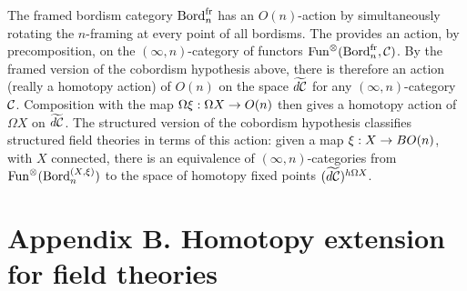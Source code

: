 \documentclass{amsart}
\begin{document}
The framed bordism category $\mathrm{Bord}^\mathrm{fr}_n$ has an $O(n)$-action by simultaneously rotating the $n$-framing at every point of all bordisms.  The provides an action, by precomposition, on the $(\infty,n)$-category of functors $\operatorname{Fun}^\otimes(\mathrm{Bord}^\mathrm{fr}_n,\mathcal C)$.  By the framed version of the cobordism hypothesis above, there is therefore an action (really a homotopy action) of $O(n)$ on the space $\widetilde{d\mathcal C}$ for any $(\infty,n)$-category $\mathcal C$.  Composition with the map $\Omega \xi: \Omega X \rightarrow O(n)$ then gives a homotopy action of $\Omega X$ on $\widetilde{d\mathcal C}$.  The structured version of the cobordism hypothesis classifies structured field theories in terms of this action: given a map $\xi: X \rightarrow BO(n)$, with $X$ connected, there is an equivalence of $(\infty,n)$-categories from $\operatorname{Fun}^\otimes(\mathrm{Bord}_n^{(X,\xi)})$ to the space of homotopy fixed points $(\widetilde{d\mathcal C})^{h\Omega X}$.


\renewcommand{\theapptheorem}{B.\arabic{apptheorem}}
\setcounter{apptheorem}{0}

\section*{Appendix B. Homotopy extension for field theories} \label{sec:Hom_ext_field_thy}
\end{document}
